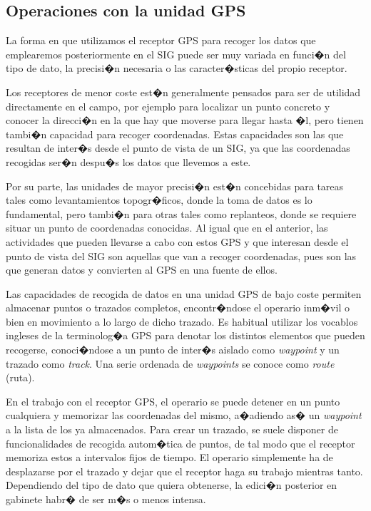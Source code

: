 \subsection{Operaciones con la unidad GPS}

La forma en que utilizamos el receptor GPS para recoger los datos que emplearemos posteriormente en el SIG puede ser muy variada en funci�n del tipo de dato, la precisi�n necesaria o las caracter�sticas del propio receptor. 

Los receptores de menor coste est�n generalmente pensados para ser de utilidad directamente en el campo, por ejemplo para localizar un punto concreto y conocer la direcci�n en la que hay que moverse para llegar hasta �l, pero tienen tambi�n capacidad para recoger coordenadas. Estas capacidades son las que resultan de inter�s desde el punto de vista de un SIG, ya que las coordenadas recogidas ser�n despu�s los datos que llevemos a este.

Por su parte, las unidades de mayor precisi�n est�n concebidas para tareas tales como levantamientos topogr�ficos, donde la toma de datos es lo fundamental, pero tambi�n para otras tales como replanteos, donde se requiere situar un punto de coordenadas conocidas. Al igual que en el anterior, las actividades que pueden llevarse a cabo con estos GPS y que interesan desde el punto de vista del SIG son aquellas que van a recoger coordenadas, pues son las que generan datos y convierten al GPS en una fuente de ellos.

Las capacidades de recogida de datos en una unidad GPS de bajo coste permiten almacenar puntos o trazados completos, encontr�ndose el operario inm�vil o bien en movimiento a lo largo de dicho trazado. Es habitual utilizar los vocablos ingleses de la terminolog�a GPS para denotar los distintos elementos que pueden recogerse, conoci�ndose a un punto de inter�s aislado como \emph{waypoint} y un trazado como \emph{track}. Una serie ordenada de \emph{waypoints} se conoce como \emph{route} (ruta).

En el trabajo con el receptor GPS, el operario se puede detener en un punto cualquiera y memorizar las coordenadas del mismo, a�adiendo as� un \emph{waypoint} a la lista de los ya almacenados. Para crear un trazado, se suele disponer de funcionalidades de recogida autom�tica de puntos, de tal modo que el receptor memoriza estos a intervalos fijos de tiempo. El operario simplemente ha de desplazarse por el trazado y dejar que el receptor haga su trabajo mientras tanto. Dependiendo del tipo de dato que quiera obtenerse, la edici�n posterior en gabinete habr� de ser m�s o menos intensa. 

